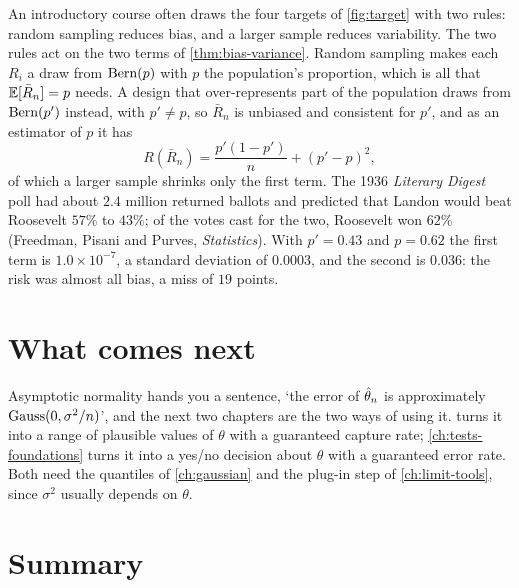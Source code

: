 \begin{bridge}
An introductory course often draws the four targets of \cref{fig:target} with two rules: random sampling reduces bias, and a larger sample reduces variability.
The two rules act on the two terms of \cref{thm:bias-variance}.
Random sampling makes each $R_i$ a draw from $\text{Bern}(p)$ with $p$ the population's proportion, which is all that $\operatorname*{\mathbb{E}}[\bar{R}_n] = p$ needs.
A design that over-represents part of the population draws from $\text{Bern}(p')$ instead, with $p' \neq p$, so $\bar{R}_n$ is unbiased and consistent for $p'$, and as an estimator of $p$ it has
\[
R(\bar{R}_n) = \frac{p'(1 - p')}{n} + (p' - p)^2,
\]
of which a larger sample shrinks only the first term.
The 1936 \textit{Literary Digest} poll had about $2.4$ million returned ballots and predicted that Landon would beat Roosevelt $57\%$ to $43\%$; of the votes cast for the two, Roosevelt won $62\%$ (Freedman, Pisani and Purves, \textit{Statistics}).
With $p' = 0.43$ and $p = 0.62$ the first term is $1.0 \times 10^{-7}$, a standard deviation of $0.0003$, and the second is $0.036$: the risk was almost all bias, a miss of $19$ points.
\end{bridge}

\section{What comes next}
\label{sec:est-next}

Asymptotic normality hands you a sentence, `the error of $\hat{\theta}_n$ is approximately $\text{Gauss}(0, \sigma^2/n)$', and the next two chapters are the two ways of using it.
 turns it into a range of plausible values of $\theta$ with a guaranteed capture rate; \cref{ch:tests-foundations} turns it into a yes/no decision about $\theta$ with a guaranteed error rate.
Both need the quantiles of \cref{ch:gaussian} and the plug-in step of \cref{ch:limit-tools}, since $\sigma^2$ usually depends on $\theta$.

\section{Summary}
\label{sec:est-summary}

